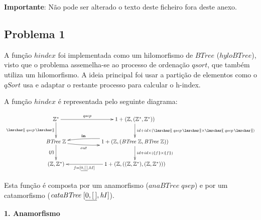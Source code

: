 \documentclass[11pt, a4paper, fleqn]{article}
\newcommand{\Conid}[1]{\mathit{#1}}
\newcommand{\Varid}[1]{\mathit{#1}}
\begin{document}
\noindent
\textbf{Importante}: Não pode ser alterado o texto deste ficheiro fora deste anexo.

\subsection*{Problema 1}

A função \ensuremath{\Varid{hindex}} foi implementada como um hilomorfismo de \ensuremath{\Conid{BTree}} (\ensuremath{\Varid{hyloBTree}}), visto que o problema assemelha-se ao processo de ordenação \ensuremath{\Varid{qsort}},
que também utiliza um hilomorfismo. A ideia principal foi usar a partição de elementos como o \ensuremath{\Varid{qSort}} usa e adaptar o restante processo para calcular o h-index.

A função \ensuremath{\Varid{hindex}} é representada pelo seguinte diagrama:

\begin{eqnarray*}
\xymatrix@C=2cm{
    \ensuremath{\mathbb{Z}}^*
           \ar[d]_-{\ensuremath{\ana{\Varid{qsep}}}}
           \ar[r]^-{\ensuremath{\Varid{qsep}}}
&
    \ensuremath{\mathrm{1}+(\mathbb{Z},(\mathbb{Z}}^*\ensuremath{,\mathbb{Z}}^*\ensuremath{))}
           \ar[d]^{\ensuremath{\Varid{id}\mathbin{+}\Varid{id}\times(\ana{\Varid{qsep}}\times\ana{\Varid{qsep}})}}
\\
    \ensuremath{\Conid{BTree}\;\mathbb{Z}}
           \ar[d]_-{\ensuremath{\cataNat{\Varid{f}}}}
           \ar@/_/[r]_-{\ensuremath{\Varid{out}}}
&
    \ensuremath{\mathrm{1}+(\mathbb{Z},(\Conid{BTree}\;\mathbb{Z},\Conid{BTree}\;\mathbb{Z}))}
           \ar[d]^{\ensuremath{\Varid{id}\mathbin{+}\Varid{id}\times(\llparenthesis\, \Varid{f}\,\rrparenthesis\times\llparenthesis\, \Varid{f}\,\rrparenthesis)}}
           \ar@/_/[l]_-{\ensuremath{\mathbf{in}}}
\\
    \ensuremath{(\mathbb{Z},\mathbb{Z}}^*\ensuremath{)}
&
    \ensuremath{\mathrm{1}+(\mathbb{Z},((\mathbb{Z},\mathbb{Z}}^*\ensuremath{),(\mathbb{Z},\mathbb{Z}}^*\ensuremath{)))}
           \ar[l]^-{\ensuremath{\Varid{f}\mathrel{=}\alt{\underline{\mathrm{0},[\mskip1.5mu \mskip1.5mu]}}{\Varid{hI}}}}
}
\end{eqnarray*}

Esta função é composta por um anamorfismo (\ensuremath{\Varid{anaBTree}\;\Varid{qsep}}) e por um catamorfismo (\ensuremath{\Varid{cataBTree}\;\alt{\underline{\mathrm{0},[\mskip1.5mu \mskip1.5mu]}}{\Varid{hI}}}).

\textbf{1. Anamorfismo}
\end{document}
